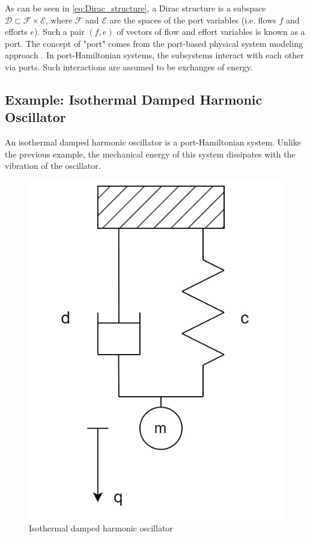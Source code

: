 \documentclass[
	parskip, 			   %
	twoside, 			   %
	DIV=14, 			   %
	BCOR=15.0mm, 		   %
	headsepline, 		   %
	open=right, 		   %
	captions=tableheading, %
	bibliography=totoc,    %
	numbers=noenddot       %
]{scrreprt}
\begin{document}
As can be seen in \ref{eq:Dirac_structure}, a Dirac structure is a subspace $\mathcal{D} \subset \mathcal{F} \times \mathcal{E}$, where $\mathcal{F}$ and $\mathcal{E}$ are the spaces of the port variables (i.e. flows $f$ and efforts $e$). Such a pair $(f,e)$ of vectors of flow and effort variables is known as a port. The concept of "port" comes from the port-based physical system modeling approach \cite{duindam2009modeling}. In port-Hamiltonian systems, the subsystems interact with each other via ports. Such interactions are assumed to be exchanges of energy.

\subsection{Example: Isothermal Damped Harmonic Oscillator}
An isothermal damped harmonic oscillator is a port-Hamiltonian system. Unlike the previous example, the mechanical energy of this system dissipates with the vibration of the oscillator.

\clearpage
\begin{figure}[h!]
    \centering
    \includegraphics[scale=0.3]{figures/isothermal damped harmonic oscillator.jpg}
    \caption{Isothermal damped harmonic oscillator}
    \label{fig:idho}
\end{figure}
\end{document}
